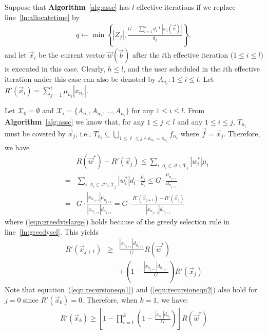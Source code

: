 \documentclass[10pt,journal,compsoc]{IEEEtran}
\begin{document}
\begin{IEEEproof}
Suppose that \textbf{Algorithm}~\ref{alg:assc} has $l$ effective iterations if we replace line~\ref{ln:allocatetime} by
\begin{eqnarray}
q\leftarrow \min\left\{|Z_j|,  \frac{G-\sum_{i=1}^n d_i*|w_i(\vec{b})|}{d_j}\right\},
\end{eqnarray}
and let $\vec{x}_i$ be the current vector $\vec{w}(\vec{b})$ after the $i$th effective iteration ($1\leq i\leq l$) is executed in this case. Clearly, $h\leq l$, and the user scheduled in the $i$th effective iteration under this case can also be denoted by $A_{n_i}: 1 \leq i\leq l$. Let $R'(\vec{x}_i)=\sum_{j=1}^i \mu_{n_j}|x_{n_j}|$.

Let $\mathcal{X}_0=\emptyset$ and $\mathcal{X}_i=\{A_{n_1},A_{n_2},...,A_{n_i}\}$ for any $1\leq i\leq l$. From \textbf{Algorithm}~\ref{alg:assc} we know that, for any $1\leq j< l$ and any $1\leq i\leq j$, $T_{n_i}$ must be covered by $\vec{x}_j$, i.e., $T_{n_i}\subseteq \bigcup_{1\leq \ell\leq j\wedge \kappa_{n_\ell}=\kappa_{n_i}} f_{n_\ell}$ where $\vec{f}=\vec{x}_j$. Therefore, we have
\begin{eqnarray}
&&R(\vec{w}^*)-R'(\vec{x}_j)\leq \sum\nolimits_{i:A_i\in \mathcal{A}\backslash \mathcal{X}_j} |w^*_{i}|\mu_{i}\nonumber\\
&=& \sum\nolimits_{i:A_i\in \mathcal{A}\backslash \mathcal{X}_j} |w^*_{i}|d_i\cdot \frac{\mu_{i}}{d_{i}} \leq G\cdot \frac{\mu_{n_{j+1}}}{d_{n_{j+1}}}  \label{eqn:greedyislarge} \\
&=& G\cdot \frac{|x_{n_{j+1}}|\mu_{n_{j+1}}}{|x_{n_{j+1}}|d_{n_{j+1}}}=G\cdot\frac{R'(\vec{x}_{j+1})-R'(\vec{x}_j)}{|x_{n_{j+1}}|d_{n_{j+1}}} \label{eqn:recursioneqn1}
\end{eqnarray}
where (\ref{eqn:greedyislarge}) holds because of the greedy selection rule in line~\ref{ln:greedysel}. This yields
\begin{eqnarray}
R'(\vec{x}_{j+1})&\geq& \frac{|x_{n_{j+1}}|d_{n_{j+1}}}{G}R(\vec{w}^*)\nonumber \\
&&+\left(1-\frac{|x_{n_{j+1}}|d_{n_{j+1}}}{G}\right)R'(\vec{x}_{j}) \label{eqn:recursioneqn2}
\end{eqnarray}
Note that equation~(\ref{eqn:recursioneqn1}) and (\ref{eqn:recursioneqn2}) also hold for $j=0$ since $R'(\vec{x}_0)=0$. Therefore, when $k=1$, we have:
\begin{eqnarray}
R'(\vec{x}_k)\geq \left[1-\prod_{i=1}^k \left(1-\frac{|x_{n_i}|d_{n_i}}{G}\right)\right]R(\vec{w}^*) \label{eqn:rxkislarge}

\end{eqnarray}
\end{IEEEproof}
\end{document}
